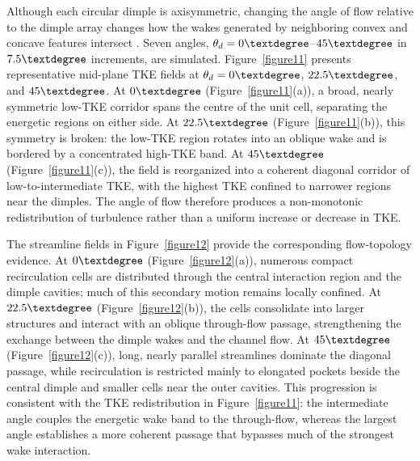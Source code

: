 \documentclass[energies,article,submit,moreauthors,noheaderline]{Definitions/mdpi}
\newcommand{\degree}{\texorpdfstring{\ensuremath{^\circ}}{\textdegree}}
\def\ensuremath#1{}%
\def\degree{\textdegree}%
\begin{document}
Although each circular dimple is axisymmetric, changing the angle of flow relative to the dimple array changes how the wakes generated by neighboring convex and concave features intersect \citep{jiang2019a, hamedi2024}. Seven angles, $\theta_d=0\degree$--$45\degree$ in $7.5\degree$ increments, are simulated. Figure~\ref{figure11} presents representative mid-plane TKE fields at $\theta_d=0\degree$, $22.5\degree$, and $45\degree$. At $0\degree$ (Figure~\ref{figure11}(a)), a broad, nearly symmetric low-TKE corridor spans the centre of the unit cell, separating the energetic regions on either side. At $22.5\degree$ (Figure~\ref{figure11}(b)), this symmetry is broken: the low-TKE region rotates into an oblique wake and is bordered by a concentrated high-TKE band. At $45\degree$ (Figure~\ref{figure11}(c)), the field is reorganized into a coherent diagonal corridor of low-to-intermediate TKE, with the highest TKE confined to narrower regions near the dimples. The angle of flow therefore produces a non-monotonic redistribution of turbulence rather than a uniform increase or decrease in TKE.





The streamline fields in Figure~\ref{figure12} provide the corresponding flow-topology evidence. At $0\degree$ (Figure~\ref{figure12}(a)), numerous compact recirculation cells are distributed through the central interaction region and the dimple cavities; much of this secondary motion remains locally confined. At $22.5\degree$ (Figure~\ref{figure12}(b)), the cells consolidate into larger structures and interact with an oblique through-flow passage, strengthening the exchange between the dimple wakes and the channel flow. At $45\degree$ (Figure~\ref{figure12}(c)), long, nearly parallel streamlines dominate the diagonal passage, while recirculation is restricted mainly to elongated pockets beside the central dimple and smaller cells near the outer cavities. This progression is consistent with the TKE redistribution in Figure~\ref{figure11}: the intermediate angle couples the energetic wake band to the through-flow, whereas the largest angle establishes a more coherent passage that bypasses much of the strongest wake interaction.
\end{document}
